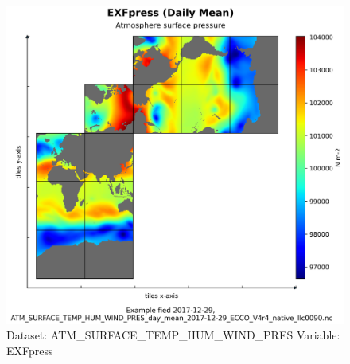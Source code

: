 \begin{figure}[H]
\centering
\includegraphics[scale=0.55]{../images/plots/native_plots/Atmosphere_Surface_Temperature_Humidity_Wind_and_Pressure/EXFpress.png}
\caption{Dataset: ATM\_SURFACE\_TEMP\_HUM\_WIND\_PRES Variable: EXFpress}
\label{tab:table-ATM_SURFACE_TEMP_HUM_WIND_PRES_EXFpress-Plot}
\end{figure}
\pagebreak
